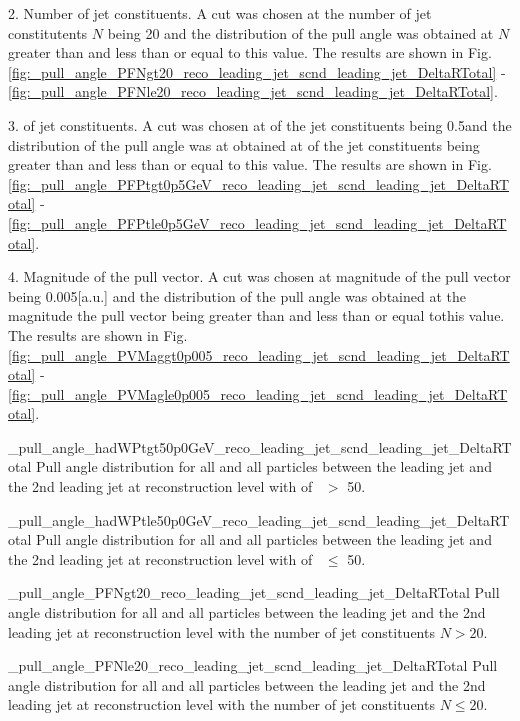 2. Number of jet constituents. A cut was chosen at the number of jet constitutents $N$ being 20 and the distribution of the pull angle was obtained at $N$ greater than and less than or equal to this value. The results are shown in Fig. \ref{fig:_pull_angle_PFNgt20_reco_leading_jet_scnd_leading_jet_DeltaRTotal} - \ref{fig:_pull_angle_PFNle20_reco_leading_jet_scnd_leading_jet_DeltaRTotal}.
                                        
3. \pt of jet constituents. A cut was chosen at \pt of the jet constituents being 0.5\GeV and the distribution of the pull angle was at obtained at \pt of the jet constituents being greater than and less than or equal to this value. The results are shown in Fig. \ref{fig:_pull_angle_PFPtgt0p5GeV_reco_leading_jet_scnd_leading_jet_DeltaRTotal} - \ref{fig:_pull_angle_PFPtle0p5GeV_reco_leading_jet_scnd_leading_jet_DeltaRTotal}.

4. Magnitude of the pull vector.  A cut was chosen at magnitude of the pull vector being 0.005[a.u.] and the distribution of the pull angle was obtained at the magnitude the pull vector being greater than and less than or equal tothis value. The results are shown in Fig. \ref{fig:_pull_angle_PVMaggt0p005_reco_leading_jet_scnd_leading_jet_DeltaRTotal} - \ref{fig:_pull_angle_PVMagle0p005_reco_leading_jet_scnd_leading_jet_DeltaRTotal}.


          {_pull_angle_hadWPtgt50p0GeV_reco_leading_jet_scnd_leading_jet_DeltaRTotal}
          {Pull angle distribution for all \DeltaR and all particles between the leading jet and the 2nd leading jet at reconstruction level with \pt of \PW\ $>$ 50\GeV.}

          {_pull_angle_hadWPtle50p0GeV_reco_leading_jet_scnd_leading_jet_DeltaRTotal}
          {Pull angle distribution for all \DeltaR and all particles between the leading jet and the 2nd leading jet at reconstruction level with \pt of \PW\ $\leq$ 50\GeV.}
          

          {_pull_angle_PFNgt20_reco_leading_jet_scnd_leading_jet_DeltaRTotal}
          {Pull angle distribution for all \DeltaR and all particles between the leading jet and the 2nd leading jet at reconstruction level with the number of jet constituents $N>20$.}

          {_pull_angle_PFNle20_reco_leading_jet_scnd_leading_jet_DeltaRTotal}
          {Pull angle distribution for all \DeltaR and all particles between the leading jet and the 2nd leading jet at reconstruction level with the number of jet constituents $N\leq20$.}

